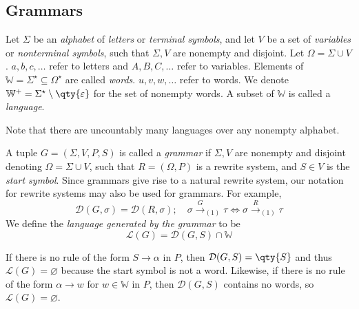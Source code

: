 \subsection{Grammars}
\begin{definition}
	Let \( \Sigma \) be an \emph{alphabet} of \emph{letters} or \emph{terminal symbols}, and let \( V \) be a set of \emph{variables} or \emph{nonterminal symbols}, such that \( \Sigma, V \) are nonempty and disjoint.
	Let \( \Omega = \Sigma \cup V \).
	\( a, b, c, \dots \) refer to letters and \( A, B, C, \dots \) refer to variables.
	Elements of \( \mathbb W = \Sigma^\star \subseteq \Omega^\star \) are called \emph{words}.
	\( u, v, w, \dots \) refer to words.
	We denote \( \mathbb W^+ = \Sigma^\star \setminus \qty{\varepsilon} \) for the set of nonempty words.
	A subset of \( \mathbb W \) is called a \emph{language}.
\end{definition}
Note that there are uncountably many languages over any nonempty alphabet.
\begin{definition}
	A tuple \( G = (\Sigma, V, P, S) \) is called a \emph{grammar} if \( \Sigma, V \) are nonempty and disjoint denoting \( \Omega = \Sigma \cup V \), such that \( R = (\Omega, P) \) is a rewrite system, and \( S \in V \) is the \emph{start symbol}.
	Since grammars give rise to a natural rewrite system, our notation for rewrite systems may also be used for grammars.
	For example,
	\[ \mathcal D(G, \sigma) = \mathcal D(R, \sigma);\quad \sigma \xrightarrow G_{(1)} \tau \iff \sigma \xrightarrow R_{(1)} \tau \]
	We define the \emph{language generated by the grammar} to be
	\[ \mathcal L(G) = \mathcal D(G,S) \cap \mathbb W \]
\end{definition}
\begin{example}
	If there is no rule of the form \( S \to \alpha \) in \( P \), then \( \mathcal D(G,S) = \qty{S} \) and thus \( \mathcal L(G) = \varnothing \) because the start symbol is not a word.
	Likewise, if there is no rule of the form \( \alpha \to w \) for \( w \in \mathbb W \) in \( P \), then \( \mathcal D(G,S) \) contains no words, so \( \mathcal L(G) = \varnothing \).
\end{example}
